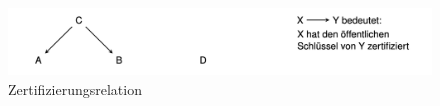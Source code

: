 \begin{figure}
  \centering
  \includegraphics[width=.6\textwidth]{res/zertifikate-1.png}
  \caption{Zertifizierungsrelation}
  \label{fig:zertifikate1}
\end{figure}